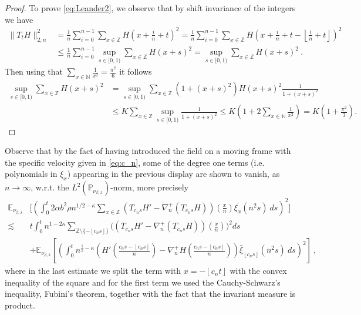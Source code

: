 \documentclass[a4paper, reqno, 12pt]{amsart}
\theoremstyle{plain}
\theoremstyle{definition}
\newcommand{\floor}[1]{\left\lfloor #1 \right\rfloor}
\newcommand{\ee}[1]{\mathbb{E}_{\nu_{\beta,\lambda}}\left[ #1 \right]}
\newcommand{\Z}{\mathbb{Z}}
\newcommand{\N}{\mathbb{N}}
\begin{document}
\begin{proof}
To prove \eqref{eq:Leander2}, we observe that by shift invariance of the integers we have
\begin{align*} \label{eq:main2nnormestimate}
        \|T_tH\|_{2,n}^2 & = \frac{1}{n} \sum_{i = 0}^{n-1} \sum_{x\in\mathbb{Z} } H\left( x + \frac{i}{n} +t\right)^2 = \frac{1}{n} \sum_{i = 0}^{n-1} \sum_{x\in\Z} H\left( x+ \frac{i}{n}+t-\floor{\frac{i}{n} + t} \right)^2\\
    &\leq \frac{1}{n} \sum_{i = 0}^{n-1} \sup_{s\in[0,1)}\sum_{x\in\Z} H\left( x+ s\right)^2 = \sup_{s\in [0,1)} \sum_{x\in\mathbb{Z}} H(x+s)^2 \ .
\end{align*}
Then using that $\sum_{x\in\N}\frac{1}{x^2} = \tfrac{\pi^2}{6}$ it follows
\begin{align*}
    \sup_{s\in[0,1)}\sum_{x\in\Z} H(x +s)^2 &=  \sup_{s\in[0,1)} \sum_{x\in\Z} (1+(x+s)^2)H(x+s)^2 \frac{1}{1+(x+s)^2} \\
    & \leq K  \sum_{x\in\Z} \sup_{s\in[0,1)} \frac{1}{1+(x+s)^2}  \leq  K\left(1+2\sum_{x\in\N}\frac{1}{x^2}\right)  =K \left(1+\frac{\pi^2}{3}\right).
\end{align*}
\end{proof}
Observe that by the fact of having introduced the field on a moving frame with the specific velocity given in \eqref{eq:c_n},  some of the degree one terms (i.e. polynomials in $\xi_x$) appearing in the previous display are shown to  vanish, as $n\to\infty$, w.r.t. the $L^2(\mathbb P_{\nu_{\beta,\lambda}})$-norm, more precisely
\begin{equation} \label{eq:discretegradapprox}
    \begin{split}
        \mathbb E_{\nu_{\beta,\lambda}}&\Bigg[ \left(\int_0^t 2\alpha b^2\rho n^{1/2-\kappa} \sum_{x\in\mathbb{Z}}\left(T_{c_n s}H' - \nabla^+_n(T_{c_n s}H)\right)(\tfrac{x}{n})\bar{\xi_x}(n^2 s)\ ds \right)^2 \Bigg] \\
         \lesssim \  & t \int_0^t  n^{1-2\kappa} \sum_{\Z \setminus \{-\floor{c_ns}\}} \Big(\left(T_{c_n s}H' - \nabla^+_n(T_{c_n s}H)\right) (\tfrac{x}{n})\Big)^2  ds  \\ 
         &+ \ee{\left(\int_0^t n^{\frac{1}{2} - \kappa} \left(H'\left(\frac{c_ns-\floor{c_ns} }{n}\right) -\nabla^+_n H\left(\frac{c_ns-\floor{c_ns} }{n}\right)\right)\bar \xi_{\floor{c_ns}}(n^2s)\ ds\right)^2}\ ,
    \end{split}
\end{equation}
where in the last estimate we split the term with $x =-\floor{c_nt}$ with the convex inequality of the square and for the first term we used the Cauchy-Schwarz's inequality, Fubini's theorem,  together with the fact that the invariant measure is product.
\end{document}
